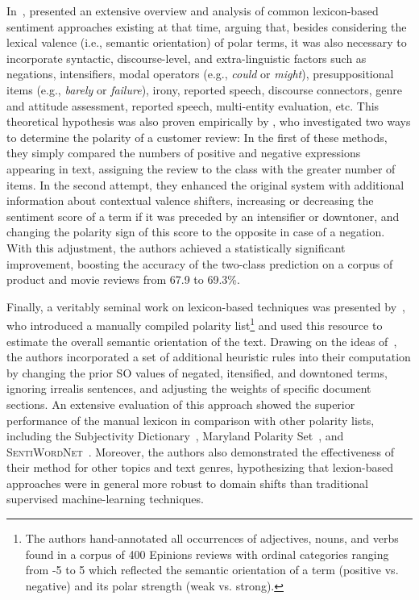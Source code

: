 In~\citeyear{Polanyi:06}, \citeauthor{Polanyi:06} presented an
extensive overview and analysis of common lexicon-based sentiment
approaches existing at that time, arguing that, besides considering
the lexical valence (i.e., semantic orientation) of polar terms, it
was also necessary to incorporate syntactic, discourse-level, and
extra-linguistic factors such as negations, intensifiers, modal
operators (e.g., \emph{could} or \emph{might}), presuppositional items
(e.g., \emph{barely} or \emph{failure}), irony, reported speech,
discourse connectors, genre and attitude assessment, reported speech,
multi-entity evaluation, etc.  This theoretical hypothesis was also
proven empirically by \citet{Kennedy:06}, who investigated two ways to
determine the polarity of a customer review: In the first of these
methods, they simply compared the numbers of positive and negative
expressions appearing in text, assigning the review to the class with
the greater number of items.  In the second attempt, they enhanced the
original system with additional information about contextual valence
shifters, increasing or decreasing the sentiment score of a term if it
was preceded by an intensifier or downtoner, and changing the polarity
sign of this score to the opposite in case of a negation.  With this
adjustment, the authors achieved a statistically significant
improvement, boosting the accuracy of the two-class prediction on a
corpus of product and movie reviews from 67.9 to 69.3\%.

Finally, a veritably seminal work on lexicon-based techniques was
presented by~\citet{Taboada:11}, who introduced a manually compiled
polarity list\footnote{The authors hand-annotated all occurrences of
  adjectives, nouns, and verbs found in a corpus of 400 Epinions
  reviews with ordinal categories ranging from -5 to 5 which reflected
  the semantic orientation of a term (positive vs. negative) and its
  polar strength (weak vs. strong).} and used this resource to
estimate the overall semantic orientation of the text.  Drawing on the
ideas of~\citet{Polanyi:06}, the authors incorporated a set of
additional heuristic rules into their computation by changing the
prior SO values of negated, itensified, and downtoned terms, ignoring
irrealis sentences, and adjusting the weights of specific document
sections.  An extensive evaluation of this approach showed the
superior performance of the manual lexicon in comparison with other
polarity lists, including the Subjectivity
Dictionary~\cite{Wilson:05}, Maryland Polarity Set~\cite{Mohammad:09},
and \textsc{SentiWordNet}~\cite{Esuli:06c}.  Moreover, the authors
also demonstrated the effectiveness of their method for other topics
and text genres, hypothesizing that lexion-based approaches were in
general more robust to domain shifts than traditional supervised
machine-learning techniques.

